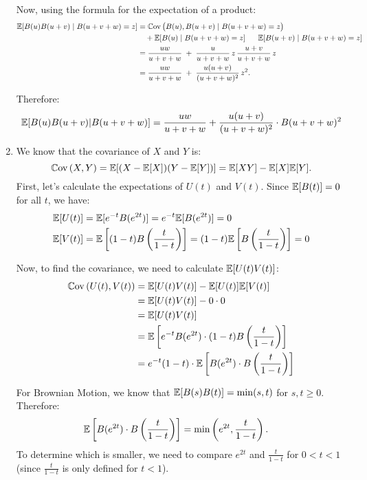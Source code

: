 \documentclass[12pt]{article}
\begin{document}
\begin{enumerate}
		Now, using the formula for the expectation of a product:
		\begin{align*}
			\mathbb{E}[B(u)B(u+v)\mid B(u+v+w) = z]
			&= \mathbb{C}\mathrm{ov}\,\bigl(B(u), B(u+v)\mid B(u+v+w) = z\bigr)\\
			&\quad {}+ \mathbb{E}[B(u)\mid B(u+v+w) = z] 
			\;\;\;\;\;\;
			\mathbb{E}[B(u+v)\mid B(u+v+w) = z]
			\\
			&= \frac{uw}{u+v+w}
			\;+\; \frac{u}{u+v+w}\,z\,\frac{u+v}{u+v+w}\,z
			\\
			&= \frac{uw}{u+v+w}
			\;+\; \frac{u(u+v)}{(u+v+w)^2}\,z^2.
		\end{align*}
		
		
		Therefore:
		\begin{equation*}
			\mathbb{E}[B(u)B(u+v)|B(u+v+w)] = \frac{uw}{u+v+w} + \frac{u(u+v)}{(u+v+w)^2} \cdot B(u+v+w)^2
		\end{equation*}
		\item We know that the covariance of $X$ and $Y$ is:
		\begin{equation*}
			\mathbb{C}\mathrm{ov}\,(X, Y) = \mathbb{E}[(X - \mathbb{E}[X])(Y - \mathbb{E}[Y])] = \mathbb{E}[XY] - \mathbb{E}[X]\mathbb{E}[Y].
		\end{equation*}
		First, let's calculate the expectations of $U(t)$ and $V(t)$. Since $\mathbb{E}[B(t)] = 0$ for all $t$, we have:
		\begin{align*}
			\mathbb{E}[U(t)] &= \mathbb{E}[e^{-t}B(e^{2t})] = e^{-t}\mathbb{E}[B(e^{2t})] = 0 \\
			\mathbb{E}[V(t)] &= \mathbb{E}\left[(1-t)B\left(\frac{t}{1-t}\right)\right] = (1-t)\mathbb{E}\left[B\left(\frac{t}{1-t}\right)\right] = 0
		\end{align*}
		
		Now, to find the covariance, we need to calculate $\mathbb{E}[U(t)V(t)]$:
		\begin{align*}
			\mathbb{C}\mathrm{ov}\,(U(t), V(t)) &= \mathbb{E}[U(t)V(t)] - \mathbb{E}[U(t)]\mathbb{E}[V(t)] \\
			&= \mathbb{E}[U(t)V(t)] - 0 \cdot 0 \\
			&= \mathbb{E}[U(t)V(t)] \\
			&= \mathbb{E}\left[e^{-t}B(e^{2t}) \cdot (1-t)B\left(\frac{t}{1-t}\right)\right] \\
			&= e^{-t}(1-t) \cdot \mathbb{E}\left[B(e^{2t}) \cdot B\left(\frac{t}{1-t}\right)\right]
		\end{align*}
		
		For Brownian Motion, we know that $\mathbb{E}[B(s)B(t)] = \min(s, t)$ for $s, t \geq 0$. Therefore:
		\begin{align*}
			\mathbb{E}\left[B(e^{2t}) \cdot B\left(\frac{t}{1-t}\right)\right] &= \min\left(e^{2t}, \frac{t}{1-t}\right).
		\end{align*}
		To determine which is smaller, we need to compare $e^{2t}$ and $\frac{t}{1-t}$ for $0 < t < 1$ (since $\frac{t}{1-t}$ is only defined for $t < 1$).
		

\end{enumerate}
\end{document}
